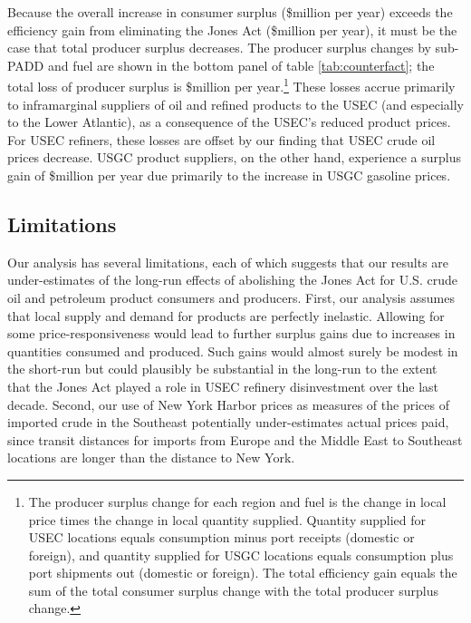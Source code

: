 \documentclass[12pt]{article}
\begin{document}
Because the overall increase in consumer surplus (\$million per year) exceeds the efficiency gain from eliminating the Jones Act (\$million per year), it must be the case that total producer surplus decreases. The producer surplus changes by sub-PADD and fuel are shown in the bottom panel of table \ref{tab:counterfact}; the total loss of producer surplus is \$million per year.\footnote{The producer surplus change for each region and fuel is the change in local price times the change in local quantity supplied. Quantity supplied for USEC locations equals consumption minus port receipts (domestic or foreign), and quantity supplied for USGC locations equals consumption plus port shipments out (domestic or foreign). The total efficiency gain equals the sum of the total consumer surplus change with the total producer surplus change.} These losses accrue primarily to inframarginal suppliers of oil and refined products to the USEC (and especially to the Lower Atlantic), as a consequence of the USEC's reduced product prices. For USEC refiners, these losses are offset by our finding that USEC crude oil prices decrease. USGC product suppliers, on the other hand, experience a surplus gain of \$million per year due primarily to the increase in USGC gasoline prices.


\subsection{Limitations} \label{sec:Limits}

Our analysis has several limitations, each of which suggests that our results are under-estimates of the long-run effects of abolishing the Jones Act for U.S. crude oil and petroleum product consumers and producers. First, our analysis assumes that local supply and demand for products are perfectly inelastic. Allowing for some price-responsiveness would lead to further surplus gains due to increases in quantities consumed and produced. Such gains would almost surely be modest in the short-run but could plausibly be substantial in the long-run to the extent that the Jones Act played a role in USEC refinery disinvestment over the last decade. Second, our use of New York Harbor prices as measures of the prices of imported crude in the Southeast potentially under-estimates actual prices paid, since transit distances for imports from Europe and the Middle East to Southeast locations are longer than the distance to New York. 
\end{document}
